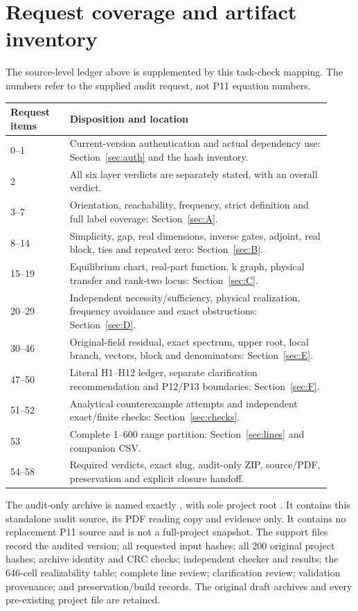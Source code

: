 \documentclass[11pt]{article}
\begin{document}
\section{Request coverage and artifact inventory}
The source-level ledger above is supplemented by this task-check mapping.
The numbers refer to the supplied audit request, not P11 equation numbers.
\begin{longtable}{p{0.17\linewidth}p{0.75\linewidth}}
\toprule Request items&Disposition and location\\\midrule\endhead
0--1&Current-version authentication and actual dependency use: Section~\ref{sec:auth} and the hash inventory.\\
2&All six layer verdicts are separately stated, with an overall verdict.\\
3--7&Orientation, reachability, frequency, strict definition and full label coverage: Section~\ref{sec:A}.\\
8--14&Simplicity, gap, real dimensions, inverse gates, adjoint, real block, ties and repeated zero: Section~\ref{sec:B}.\\
15--19&Equilibrium chart, real-part function, k graph, physical transfer and rank-two locus: Section~\ref{sec:C}.\\
20--29&Independent necessity/sufficiency, physical realization, frequency avoidance and exact obstructions: Section~\ref{sec:D}.\\
30--46&Original-field residual, exact spectrum, upper root, local branch, vectors, block and denominators: Section~\ref{sec:E}.\\
47--50&Literal H1--H12 ledger, separate clarification recommendation and P12/P13 boundaries: Section~\ref{sec:F}.\\
51--52&Analytical counterexample attempts and independent exact/finite checks: Section~\ref{sec:checks}.\\
53&Complete 1--600 range partition: Section~\ref{sec:lines} and companion CSV.\\
54--58&Required verdicts, exact slug, audit-only ZIP, source/PDF, preservation and explicit closure handoff.\\
\bottomrule
\end{longtable}
The audit-only archive is named exactly
, with sole project root
. It contains this standalone audit source,
its PDF reading copy and  evidence only.
It contains no replacement P11 source and is not a full-project snapshot.
The support files record the audited version; all requested input hashes;
all 200 original project hashes; archive identity and CRC checks; independent
checker and results; the 646-cell realizability table; complete line review;
clarification review; validation provenance; and preservation/build records.
The original draft archives and every pre-existing project file are retained.
\end{document}
